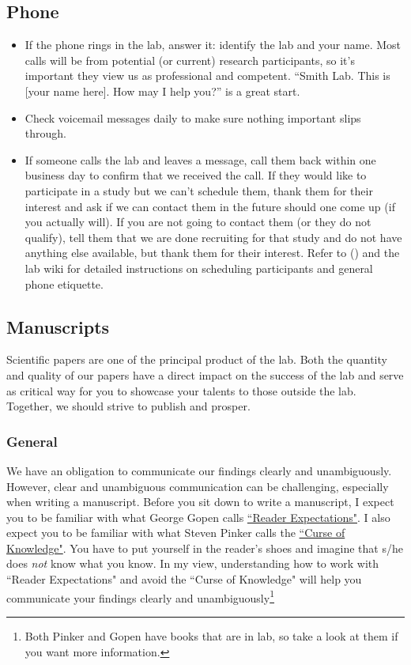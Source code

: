 \documentclass[letterpaper,12pt,oneside]{memoir}
\begin{document}
\subsection{Phone}

\begin{itemize}
\item If the phone rings in the lab, answer it: identify the lab and your name. Most calls will be from potential (or current) research participants, so it's important they view us as professional and competent. ``Smith Lab. This is [your name here]. How may I help you?'' is a great start. 
\item Check voicemail messages daily to make sure nothing important slips through.
\item If someone calls the lab and leaves a message, call them back within one business day to confirm that we received the call. If they would like to participate in a study but we can't schedule them, thank them for their interest and ask if we can contact them in the future should one come up (if you actually will). If you are not going to contact them (or they do not qualify), tell them that we are done recruiting for that study and do not have anything else available, but thank them for their interest. Refer to  () and the lab wiki for detailed instructions on scheduling participants and general phone etiquette.

\end{itemize}


\subsection{Manuscripts}
Scientific papers are one of the principal product of the lab. Both the quantity and quality of our papers have a direct impact on the success of the lab and serve as critical way for you to showcase your talents to those outside the lab. Together, we should strive to publish and prosper. 

\subsubsection{General}
\label{sec:ms_general}

We have an obligation to communicate our findings clearly and unambiguously. However, clear and unambiguous communication can be challenging, especially when writing a manuscript. Before you sit down to write a manuscript, I expect you to be familiar with what George Gopen calls \href{https://cseweb.ucsd.edu/~swanson/papers/science-of-writing.pdf}{``Reader Expectations"}. I also expect you to be familiar with what Steven Pinker calls the \href{https://stevenpinker.com/files/pinker/files/why_academics_stink_at_writing.pdf}{``Curse of Knowledge"}. You have to put yourself in the reader's shoes and imagine that s/he does \textit{not} know what you know. In my view, understanding how to work with ``Reader Expectations" and avoid the ``Curse of Knowledge" will help you communicate your findings clearly and unambiguously\footnote{Both Pinker and Gopen have books that are in lab, so take a look at them if you want more information.}
\end{document}

